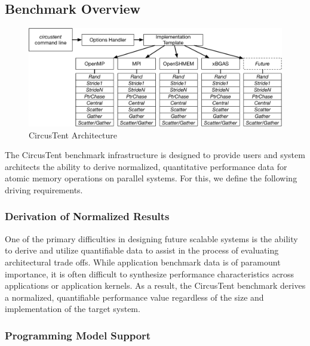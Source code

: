 

\subsection{Benchmark Overview}
\label{subsec:benchmark_overview}

\begin{figure}[!t]
\centering
\includegraphics[width=5in]{figures/arch.pdf}
\caption{CircusTent Architecture}
\label{fig:ct_arch}
\end{figure}

The CircusTent benchmark infrastructure is designed to provide users and system architects the ability to derive normalized, quantitative performance data for atomic memory operations on parallel systems.  For this, we define the following driving requirements.  

\subsubsection*{Derivation of Normalized Results}

One of the primary difficulties in designing future scalable systems is the ability to derive and utilize quantifiable data to assist in the process of evaluating architectural trade offs.
While application benchmark data is of paramount importance, it is often difficult to synthesize performance characteristics across applications or application kernels.
As a result, the CircusTent benchmark derives a normalized, quantifiable performance value regardless of the size and implementation of the target system.  

\subsubsection*{Programming Model Support}


